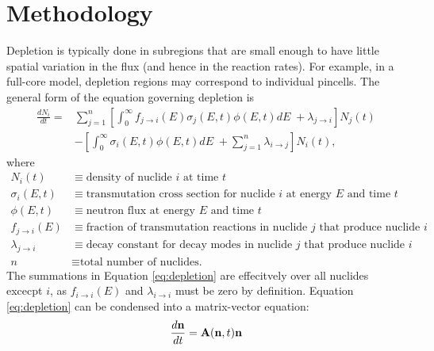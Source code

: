\section{Methodology}
    \label{sec:methods}
    Depletion is typically done in subregions that are small enough to have
    little spatial variation in the flux (and hence in the reaction rates). For
    example, in a full-core model, depletion regions may correspond to
    individual pincells. The general form of the equation governing depletion is
    \begin{equation}
      \label{eq:depletion}
      \begin{split}
        \frac{dN_i}{dt} = &\sum\limits_{j=1}^n \left[ \int_0^\infty 
        f_{j \rightarrow i}(E) \sigma_j (E, t) \phi(E,t) dE \;+ \lambda_{j\rightarrow i}
        \right] N_j(t) \\ &- \left [\int_0^\infty \sigma_i (E,t) \phi(E,t) dE \; +
        \sum\limits_{j=1}^n \lambda_{i\rightarrow j} \right ] N_i(t),
      \end{split}
    \end{equation}
    where
    \begin{equation*}
      \begin{split}
        N_i(t) &\equiv \text{density of nuclide $i$ at time $t$} \\
        \sigma_i(E,t) &\equiv \text{transmutation cross section for nuclide $i$ at energy $E$ and time $t$} \\
        \phi(E,t) &\equiv \text{neutron flux at energy $E$ and time $t$} \\
        f_{j \rightarrow i}(E) &\equiv \text{fraction of transmutation reactions in nuclide $j$ that produce nuclide $i$} \\
        \lambda_{j \rightarrow i} &\equiv \text{decay constant for decay modes in nuclide $j$ that produce nuclide $i$} \\
        n &\equiv \text{total number of nuclides.}
      \end{split}
    \end{equation*}
    The summations in Equation \ref{eq:depletion} are effecitvely over all
    nuclides excecpt $i$, as $f_{i \rightarrow i}(E)$ and $\lambda_{i \rightarrow i}$ must
    be zero by definition. Equation \ref{eq:depletion} can be condensed into a
    matrix-vector equation:
    \begin{equation}
      \label{eq:depletion-matrix-t}
      \frac{d\mathbf{n}}{dt} = \mathbf{A}(\mathbf{n},t)\mathbf{n}
    \end{equation}
